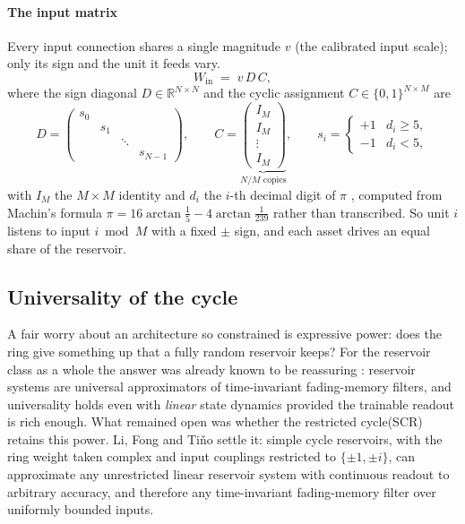 \paragraph{The input matrix}
Every input connection shares a single magnitude $v$ (the calibrated input
scale); only its sign and the unit it feeds vary.
\begin{equation}
  W_{\mathrm{in}} \;=\; v\,D\,C,
  \label{eq:scr-input-vdc}
\end{equation}
where the sign diagonal $D \in \mathbb{R}^{N\times N}$ and the cyclic
assignment $C \in \{0,1\}^{N\times M}$ are
\begin{equation}
  D =
  \begin{pmatrix}
    s_0 &        &        &        \\
        & s_1    &        &        \\
        &        & \ddots &        \\
        &        &        & s_{N-1}
  \end{pmatrix},
  \qquad
  C =
  \underbrace{
  \begin{pmatrix}
    I_M \\ I_M \\ \vdots \\ I_M
  \end{pmatrix}}_{N/M \text{ copies}},
  \qquad
  s_i =
  \begin{cases}
    +1 & d_i \ge 5,\\
    -1 & d_i < 5,
  \end{cases}
\end{equation}
with $I_M$ the $M\times M$ identity and $d_i$ the $i$-th decimal digit of
$\pi$ \cite{rodan2011simple}, computed from Machin's formula
$\pi = 16\arctan\tfrac{1}{5} - 4\arctan\tfrac{1}{239}$ rather than transcribed.
So unit $i$ listens to input $i \bmod M$ with a fixed $\pm$ sign, and each asset
drives an equal share of the reservoir.

\subsection{Universality of the cycle}
\label{sec:bg-universality}

A fair worry about an architecture so constrained is expressive power: does the ring give something up that a fully random reservoir keeps? For the reservoir class as a whole the answer was already known to be reassuring \cite{grigoryeva2018universal}: reservoir systems are universal approximators of time-invariant fading-memory filters, and universality holds even with \emph{linear} state dynamics provided the trainable readout is rich enough. What remained open was whether the restricted cycle(SCR) retains this power. Li, Fong and Ti\v{n}o \cite{li2024universal} settle it: simple cycle reservoirs, with the ring weight taken complex and input couplings restricted to $\{\pm 1, \pm i\}$, can approximate any unrestricted linear reservoir system with continuous readout to arbitrary accuracy, and therefore any time-invariant fading-memory filter over uniformly bounded inputs.

